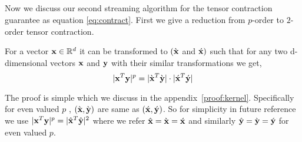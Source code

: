 \subsection{}
Now we discuss our second streaming algorithm for the tensor contraction guarantee as equation \eqref{eq:contract}. First we give a reduction from $p$-order to $2$-order tensor contraction.
\begin{lemma}{\label{lemma:kernel}}
 For a vector $\mathbf{x} \in \mathbb{R}^{d}$ it can be transformed to $(\grave{\mathbf{x}}$ and $\acute{\mathbf{x}})$ such that for any two d-dimensional vectors $\mathbf{x}$ and $\mathbf{y}$ with their similar transformations we get,
 $$|\mathbf{x}^{T}\mathbf{y}|^{p} = |\grave{\mathbf{x}}^{T}\grave{\mathbf{y}}|\cdot|\acute{\mathbf{x}}^{T}\acute{\mathbf{y}}|$$
\end{lemma}
% 
The proof is simple which we discuss in the appendix~\ref{proof:kernel}. Specifically for even valued $p$ , $(\grave{\mathbf{x}},\grave{\mathbf{y}})$ are same as $(\acute{\mathbf{x}},\acute{\mathbf{y}})$. So for simplicity in future reference we use $|\mathbf{x}^{T}\mathbf{y}|^{p} = |\hat{\mathbf{x}}^{T}\hat{\mathbf{y}}|^{2}$ where we refer $\hat{\mathbf{x}} = \grave{\mathbf{x}} = \acute{\mathbf{x}}$ and similarly $\hat{\mathbf{y}} = \grave{\mathbf{y}} = \acute{\mathbf{y}}$ for even valued $p$.

